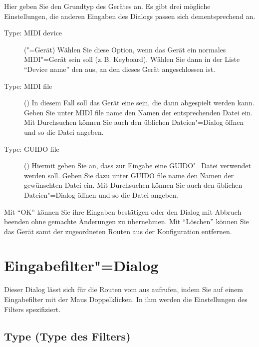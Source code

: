 Hier geben Sie den Grundtyp des Gerätes an. Es gibt drei mögliche 
Einstellungen, die anderen Eingaben des Dialogs passen sich dementsprechend 
an.

\begin{description}
\item[Type: MIDI device] ("=Gerät)
  Wählen Sie diese Option, wenn das Gerät ein normales MIDI"=Gerät
  sein soll (z.\,B. Keyboard). Wählen Sie dann in der Liste "`Device
  name"' den  aus, an den dieses
  Gerät angeschlossen ist.

\item[Type: MIDI file] ()
  In diesem Fall soll das Gerät eine
   sein, die dann abgespielt
  werden kann. Geben Sie unter MIDI file name den Namen der
  entsprechenden Datei ein. Mit Durchsuchen können Sie auch den
  üblichen Dateien"=Dialog öffnen und so die Datei angeben.

\item[Type: GUIDO file] () Hiermit
  geben Sie an, dass zur Eingabe eine GUIDO"=Datei verwendet werden
  soll. Geben Sie dazu unter GUIDO file name den Namen der gewünschten
  Datei ein. Mit Durchsuchen können Sie auch den üblichen
  Dateien"=Dialog öffnen und so die Datei angeben.
\end{description}


Mit "`OK"' können Sie ihre Eingaben bestätigen oder den Dialog mit Abbruch
beenden ohne gemachte Änderungen zu übernehmen.  Mit "`Löschen"'
können Sie das Gerät samt der zugeordneten Routen aus der
Konfiguration entfernen.

\section{Eingabefilter"=Dialog}\label{sec:DE_R1}
Dieser Dialog lässt sich für die Routen vom
 aus aufrufen, indem Sie auf
einem Eingabefilter mit der Maus Doppelklicken. In ihm werden die
Einstellungen des Filters spezifiziert.

\subsection{Type (Type des Filters)}

